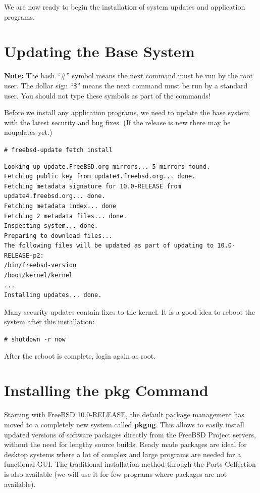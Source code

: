 \documentclass[a4paper,twoside,12pt]{article}
\newcommand{\coderoot}[1]{\texttt{\# #1}}
\begin{document}
We are now ready to begin the installation of system updates and application programs.


\section{Updating the Base System}

\textbf{Note:} The hash ``#'' symbol means the next command must be run by the root user. The dollar sign ``\$'' means the next command must be run by a standard user. You should not type these symbols as part of the commands!

Before we install any application programs, we need to update the base system with the latest security and bug fixes. (If the release is new there may be noupdates yet.)

\coderoot{freebsd-update fetch install}

\begin{verbatim}
Looking up update.FreeBSD.org mirrors... 5 mirrors found.
Fetching public key from update4.freebsd.org... done.
Fetching metadata signature for 10.0-RELEASE from
update4.freebsd.org... done.
Fetching metadata index... done
Fetching 2 metadata files... done.
Inspecting system... done.
Preparing to download files...
The following files will be updated as part of updating to 10.0-
RELEASE-p2:
/bin/freebsd-version
/boot/kernel/kernel
...
Installing updates... done.
\end{verbatim}

Many security updates contain fixes to the kernel. It is a good idea to reboot the system after this installation:

\coderoot{shutdown -r now}

After the reboot is complete, login again as root.

\section{Installing the pkg Command}

Starting with FreeBSD 10.0-RELEASE, the default package management has moved to a completely new system called \textbf{pkgng}. This allows to easily install updated versions of software packages directly from the FreeBSD Project servers, without the need for lengthy source builds. Ready made packages are ideal for desktop systems where a lot of complex and large programs are needed for a functional GUI. The traditional installation method through the Ports Collection is also available (we will use it for few programs where packages are not available).
\end{document}
